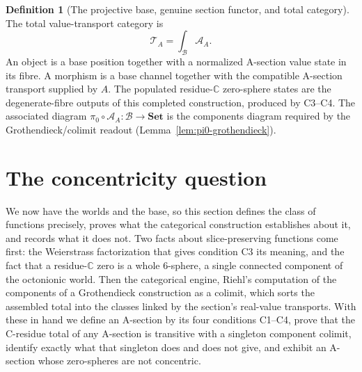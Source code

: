 \documentclass[11pt]{article}
\newcommand{\CC}{\mathbb{C}}
\theoremstyle{plain}
\theoremstyle{definition}
\newtheorem{definition}[theorem]{Definition}
\theoremstyle{remark}
\begin{document}
\begin{definition}[The projective base, genuine section functor, and total category]
The total value-transport category is
\[
  \mathcal T_A=\int_{\mathcal B}\mathcal A_A.
\]
An object is a base position together with a normalized A-section value state in its fibre. A
morphism is a base channel together with the compatible A-section transport supplied by $A$.
The populated residue-$\CC$ zero-sphere states are the degenerate-fibre outputs of this
completed construction, produced by \textup{C3--C4}. The associated diagram
$\pi_0\circ\mathcal A_A:\mathcal B\to\mathbf{Set}$ is the components diagram required by the
Grothendieck/colimit readout (Lemma~\ref{lem:pi0-grothendieck}).
\end{definition}


\section{The concentricity question}\label{sec:detector}

We now have the worlds and the base, so this section defines the class of functions precisely,
proves what the categorical construction establishes about it, and records what it does not. Two
facts about slice-preserving functions come first: the Weierstrass
factorization that gives condition C3 its meaning, and the fact that a residue-$\CC$ zero is a whole
$6$-sphere, a single connected component of the octonionic world. Then the categorical engine,
Riehl's computation of the components of a Grothendieck construction as a colimit, which sorts the
assembled total into the classes linked by the section's real-value transports. With these in hand
we define an A-section by its four conditions C1--C4, prove that the C-residue total of any
A-section is transitive with a singleton component colimit, identify exactly what that singleton
does and does not give, and exhibit an A-section whose zero-spheres are not concentric.
\end{document}
